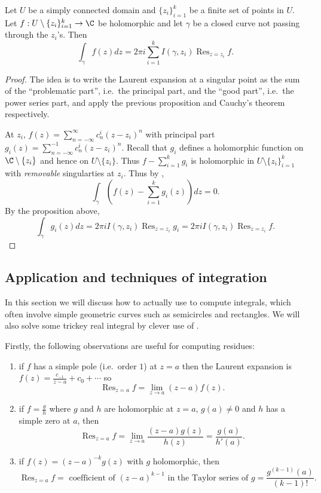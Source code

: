 \documentclass[a4paper]{article}
\DeclareMathOperator*{\res}{Res}
\begin{document}
\begin{theorem}
  \label{thm:residue}
  Let \(U\) be a simply connected domain and \(\{z_i\}_{i = 1}^k\) be a finite set of points in \(U\). Let \(f: U \setminus \{z_i\}_{i = 1}^k \to \C\) be holomorphic and let \(\gamma\) be a closed curve not passing through the \(z_i\)'s. Then
  \[
    \int_\gamma f(z)dz = 2\pi i \sum_{i = 1}^k I(\gamma, z_i) \res_{z = z_i} f.
  \]
\end{theorem}

\begin{proof}
  The idea is to write the Laurent expansion at a singular point as the sum of the ``problematic part'', i.e.\ the principal part, and the ``good part'', i.e.\ the power series part, and apply the previous proposition and Cauchy's theorem respectively.

  At \(z_i\), \(f(z) = \sum_{n = -\infty}^\infty c_n^i (z - z_i)^n\) with principal part \(g_i(z) = \sum_{n = -\infty}^{-1} c_n^i(z - z_i)^n\). Recall that \(g_i\) defines a holomorphic function on \(\C \setminus \{z_i\}\) and hence on \(U \setminus \{z_i\}\). Thus \(f - \sum_{i = 1}^kg_i\) is holomorphic in \(U \setminus \{z_i\}_{i = 1}^k\) with \emph{removable} singularties at \(z_i\). Thus by ,
  \[
    \int_\gamma (f(z) - \sum_{i = 1}^k g_i(z)) dz = 0.
  \]
  By the proposition above,
  \[
    \int_\gamma g_i(z) dz = 2\pi i I(\gamma, z_i) \res_{z = z_i} g_i = 2\pi i I(\gamma, z_i) \res_{z = z_i} f.
  \]
\end{proof}

\subsection{Application and techniques of integration}

In this section we will discuss how to actually use  to compute integrals, which often involve simple geometric curves such as semicircles and rectangles. We will also solve some trickey real integral by clever use of .

Firstly, the following observations are useful for computing residues:
\begin{enumerate}
\item if \(f\) has a simple pole (i.e.\ order \(1\)) at \(z = a\) then the Laurent expansion is \(f(z) = \frac{c_{-1}}{z - a} + c_0 + \cdots\) so
  \[
    \res_{z = a}f = \lim_{z \to a} (z - a)f(z).
  \]
\item if \(f = \frac{g}{h}\) where \(g\) and \(h\) are holomorphic at \(z = a\), \(g(a) \neq 0\) and \(h\) has a simple zero at \(a\), then
  \[
    \res_{z = a} f
    = \lim_{z \to a} \frac{(z - a)g(z)}{h(z)}
    =  \frac{g(a)}{h'(a)}.
  \]
\item if \(f(z) = (z - a)^{-k}g(z)\) with \(g\) holomorphic, then
  \[
    \res_{z = a}f
    = \text{ coefficient of } (z - a)^{k - 1} \text{ in the Taylor series of } g
    = \frac{g^{(k - 1)}(a)}{(k - 1)!}.
  \]
\end{enumerate}
\end{document}
